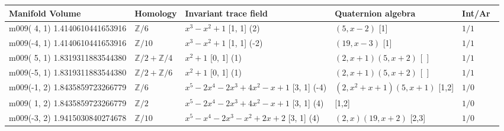 \documentclass[a4paper]{amsart}
\def\Z{{\mathbb Z}}
\newcommand{\PreserveBackslash}[1]{\let\temp =\\#1\let\\=\temp}
\theoremstyle{definition}
\begin{document}
\begin{table}[h] 
\centering
\begin{tabular}{|>{\PreserveBackslash\raggedright}p{3.2cm}|l| %
	>{\PreserveBackslash\raggedright}p{3.5cm}|
	>{\PreserveBackslash\raggedright}p{3.0cm}|l|}

\hline

\hbox{Manifold} Volume  & Homology & Invariant trace field  & Quaternion algebra & Int/Ar\ \\

\hline 

 m009( 4, 1) 
 1.4140610441653916  &$\Z/6$  &
\hbox{$x^3 - x^2 + 1$} 
[1, 1] (2) &
\hbox{$(5, x-2)$} [1]&
$1/1$ \\

\hline 

 m009(-4, 1) 
1.4140610441653916    &$\Z/10$ &
\hbox{$ x^3 - x^2 + 1$} 
[1, 1] (-2) &
\hbox{$(19, x-3)$} [1]&
$1/1$ \\

\hline 

 m009( 5, 1) 
 1.8319311883544380  &$\Z/2 + \Z/$4&
\hbox{$ x^2 + 1$} 
[0, 1] (1) &
\hbox{$(2, x+1) (5,x+2)$} [~] &
$1/1$ \\

\hline

m009(-5, 1)
1.8319311883544380    &    $\Z/2 + \Z/6$ &
\hbox{$ x^2 + 1$} 
[0, 1] (1) &
\hbox{$(2, x+1) (5,x+2)$} [~] &
$1/1$ \\

\hline

m009(-1, 2)
1.8435859723266779     &         $\Z/6$ &
\hbox{$x^5 - 2x^4 - 2x^3 + 4x^2 - x + 1$} 
[3, 1] (-4) &
\hbox{$(2,x^2+x+1) (5,x+1)$} [1,2]&
$1/0$ \\


\hline
 m009( 1, 2)
 1.8435859723266779      &        $\Z/2$  & 
\hbox{$x^5 - 2x^4 - 2x^3 + 4x^2 - x + 1$} 
[3, 1] (4) &
[1,2] &
$1/0$ \\


\hline
m009(-3, 2)
1.9415030840274678       &      $\Z/10$  &
\hbox{$x^5 - x^4 - 2x^3 - x^2 + 2x + 2$} 
[3, 1] (4) &
\hbox{$(2,x) (19,x+2)$} [2,3]&
$1/0$ \\
    


\end{tabular}
\end{table}
\end{document}
